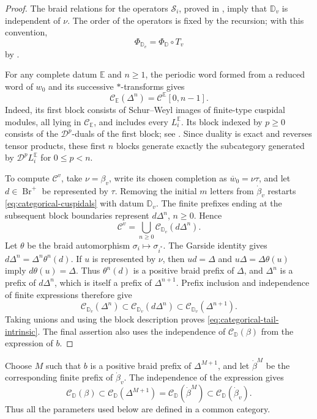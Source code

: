 \documentclass[12pt, reqno]{amsart}
\theoremstyle{plain}
\theoremstyle{definition}
\numberwithin{equation}{section}
\newcommand{\DD}{\mathbb{D}}
\newcommand{\Br}{{\operatorname{Br}}}
\begin{document}
\begin{proof}
The braid relations for the operators \(\mathscr S_i\), proved in
\cite[Corollary~3.22]{kashiwara2025monoidal}, imply that \(\DD_v\)
is independent of \(\nu\). The order of the operators is fixed by the
recursion; with this convention,
\[
\Phi_{\DD_v}=\Phi_{\DD}\circ T_v
\]
by \cite[Corollary~3.23]{kashiwara2025monoidal}.

For any complete datum \(\mathbb E\) and \(n\ge1\), the periodic
word formed from a reduced word of \(w_0\) and its successive
\(*\)-transforms gives
\[
\mathscr C_{\mathbb E}(\Delta^n)=\mathscr C^{\mathbb E}[0,n-1].
\]
Indeed, its first block consists of Schur--Weyl images of finite-type
cuspidal modules, all lying in \(\mathscr C_{\mathbb E}\), and includes
every \(L_i^{\mathbb E}\). Its block indexed by \(p\ge0\) consists of
the \(\mathcal D^p\)-duals of the first block; see
\cite[(3.24) and Theorem~4.6(i)--(ii)]{kashiwara2025monoidal}.
Since duality is exact and reverses tensor products, these first \(n\)
blocks generate exactly the subcategory generated by
\(\mathcal D^pL_i^{\mathbb E}\) for \(0\le p<n\).

To compute \(\mathscr C^v\), take \(\nu=\beta_v\), write its chosen
completion as \(\overline w_0=\nu\tau\), and let \(d\in\Br^+\) be
represented by \(\tau\). Removing the initial
\(m\) letters from \(\dot\beta_v\) restarts
\eqref{eq:categorical-cuspidals} with datum \(\DD_v\). The finite
prefixes ending at the subsequent block boundaries represent
\(d\Delta^n\), \(n\ge0\). Hence
\[
\mathscr C^v=\bigcup_{n\ge0}\mathscr C_{\DD_v}(d\Delta^n).
\]
Let \(\theta\) be the braid automorphism \(\sigma_i\mapsto\sigma_{i^*}\).
The Garside identity gives \(d\Delta^n=\Delta^n\theta^n(d)\).
If \(u\) is represented by \(\nu\), then \(ud=\Delta\) and
\(u\Delta=\Delta\theta(u)\) imply \(d\theta(u)=\Delta\).
Thus \(\theta^n(d)\) is a positive braid prefix of \(\Delta\), and
\(\Delta^n\) is a prefix of \(d\Delta^n\), which is itself a prefix
of \(\Delta^{n+1}\). Prefix inclusion and independence
of finite expressions
\cite[Corollary~5.34]{kashiwara2025monoidal} therefore give
\[
\mathscr C_{\DD_v}(\Delta^n)
\subset\mathscr C_{\DD_v}(d\Delta^n)
\subset\mathscr C_{\DD_v}(\Delta^{n+1}).
\]
Taking unions and using the block description proves
\eqref{eq:categorical-tail-intrinsic}. The final assertion also uses
the independence of \(\mathscr C_{\DD}(\beta)\) from the expression
of \(b\).
\end{proof}

Choose \(M\) such that \(b\) is a positive braid prefix of
\(\Delta^{M+1}\), and let \(\dot\beta^M\) be the corresponding finite
prefix of \(\dot\beta_v\). The independence of the expression gives
\[
\mathscr C_{\DD}(\beta)\subset
\mathscr C_{\DD}(\Delta^{M+1})
=\mathscr C_{\DD}(\dot\beta^M)
\subset\mathscr C_{\DD}(\dot\beta_v).
\]
Thus all the parameters used below are defined in a common category.
\end{document}
